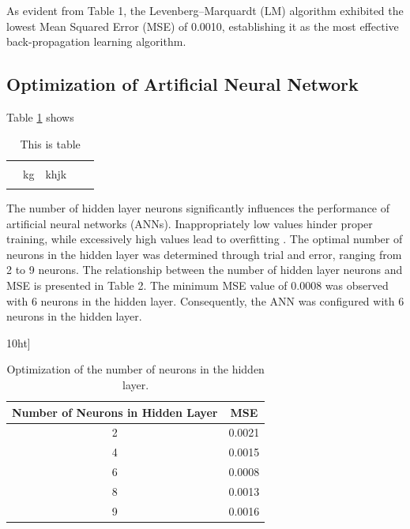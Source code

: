 \documentclass{article}
\begin{document}
As evident from Table 1, the Levenberg–Marquardt (LM) algorithm exhibited the lowest Mean Squared Error (MSE) of 0.0010, establishing it as the most effective back-propagation learning algorithm.

\subsection{Optimization of Artificial Neural Network}
Table \ref{table:myt} shows



\begin{table}
	\centering
	\caption{This is table}
    \label{table:myt}
\begin{tabular}{c|c|c|cc|}
	\hline
	&  &  &  &  \\
	\hline
	&  &  &  &  \\
	\hline
	& kg & khjk &  &  \\

	&  &  &  &  \\
	\hline
\end{tabular}

\end{table}

The number of hidden layer neurons significantly influences the performance of artificial neural networks (ANNs). Inappropriately low values hinder proper training, while excessively high values lead to overfitting \cite{ref11}. The optimal number of neurons in the hidden layer was determined through trial and error, ranging from 2 to 9 neurons. The relationship between the number of hidden layer neurons and MSE is presented in Table 2. The minimum MSE value of 0.0008 was observed with 6 neurons in the hidden layer. Consequently, the ANN was configured with 6 neurons in the hidden layer.

\begin{table}10ht]
	\centering
	\begin{tabular}{|c|c|}
		\hline
		\textbf{Number of Neurons in Hidden Layer} & \textbf{MSE} \\ \hline
		2                                          & 0.0021      \\ \hline
		4                                          & 0.0015      \\ \hline
		6                                          & 0.0008      \\ \hline
		8                                          & 0.0013      \\ \hline
		9                                          & 0.0016      \\ \hline
	\end{tabular}
	\caption{Optimization of the number of neurons in the hidden layer.}
	\label{tab:hidden_layer_neurons}
\end{table}
\end{document}

